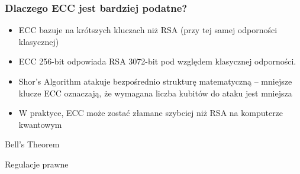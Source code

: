 \begin{frame}
    \frametitle{Dlaczego ECC jest bardziej podatne?}
    \begin{itemize}
        \item ECC bazuje na krótszych kluczach niż RSA (przy tej samej odporności klasycznej)
        \item ECC 256-bit odpowiada RSA 3072-bit pod względem klasycznej odporności.
        \item Shor’s Algorithm atakuje bezpośrednio strukturę matematyczną – mniejsze klucze ECC oznaczają, że wymagana liczba kubitów do ataku jest mniejsza
        \item W praktyce, ECC może zostać złamane szybciej niż RSA na komputerze kwantowym
    \end{itemize}
\end{frame}






\begin{frame}{Bell's Theorem} %

\end{frame}

\begin{frame}{Regulacje prawne}

\end{frame}
